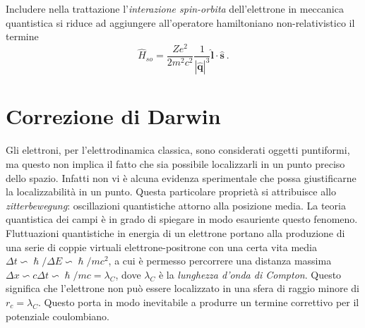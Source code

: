 \documentclass[12pt,a4paper]{report}
\numberwithin{equation}{section}
\numberwithin{section}{chapter}
\begin{document}
	Includere nella trattazione l'\textit{interazione spin-orbita}  dell'elettrone in meccanica quantistica si riduce ad aggiungere all'operatore hamiltoniano non-relativistico il termine
	\begin{equation}
	\label{corrso20}
	\widehat{H}_{so} = \frac{Ze^2}{2m^2c^2}\frac{1}{|\widehat{\boldsymbol{q}}|^3}\widehat{\boldsymbol{l}} \cdot \widehat{\boldsymbol{s}}~.
	\end{equation}
	
		
\section{Correzione di Darwin} \label{sec:corrda}

	Gli elettroni, per l'elettrodinamica classica, sono considerati oggetti puntiformi, ma questo non implica il fatto che sia possibile localizzarli in un punto preciso dello spazio. Infatti non vi \`e alcuna evidenza sperimentale che possa giustificarne la localizzabilit\`a in un punto. Questa particolare propriet\`a si attribuisce allo \textit{zit\-ter\-be\-we\-gung}: oscillazioni quantistiche attorno alla posizione media. La teoria quantistica dei campi \`e in grado di spiegare in modo esauriente questo fenomeno. Fluttuazioni quantistiche in energia di un elettrone portano alla produzione di una serie di coppie virtuali elettrone-positrone con una certa vita media $\varDelta t \backsim \hslash/\varDelta E \backsim \hslash/mc^2$, a cui \`e permesso percorrere una distanza massima $\varDelta x \backsim c \varDelta t \backsim \hslash/mc = \lambda_C$, dove $\lambda_C$ \`e la \textit{lunghezza d'onda di Compton}. Questo significa che l'elettrone non pu\`o essere localizzato in una sfera di raggio minore di $r_c = \lambda_C$. Questo porta in modo inevitabile a produrre un termine correttivo per il potenziale coulombiano.
	
\end{document}
